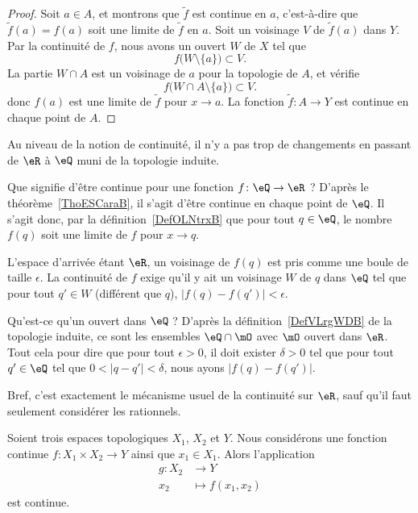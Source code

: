 \begin{proof}
    Soit \( a\in A\), et montrons que \( \tilde f\) est continue en \( a\), c'est-à-dire que \( \tilde f(a)=f(a)\) soit une limite de \( \tilde f\) en \( a\). Soit un voisinage \( V\) de \( \tilde f(a)\) dans \( Y\). Par la continuité de \( f\), nous avons un ouvert \( W\) de \( X\) tel que 
    \begin{equation}
        f\big( W\setminus\{ a \} \big)\subset V.
    \end{equation}
    La partie \( W\cap A\) est un voisinage de \( a\) pour la topologie de \( A\), et vérifie
    \begin{equation}
        f\big( W\cap A\setminus\{ a \} \big)\subset V.
    \end{equation}
    donc \( f(a)\) est une limite de \( \tilde f\) pour \( x\to a\). La fonction \( \tilde f\colon A\to Y\) est continue en chaque point de \( A\).
\end{proof}

Au niveau de la notion de continuité, il n'y a pas trop de changements en passant de \( \eR\) à \( \eQ\) muni de la topologie induite.

\begin{example}     \label{EXooHWIIooYYbfGE}
    Que signifie d'être continue pour une fonction \( f\colon \eQ\to \eR\) ? D'après le théorème~\ref{ThoESCaraB}, il s'agit d'être continue en chaque point de \( \eQ\). Il s'agit donc, par la définition~\ref{DefOLNtrxB} que pour tout \( q\in \eQ\), le nombre \( f(q)\) soit une limite de \( f\) pour \( x\to q\).

    L'espace d'arrivée étant \( \eR\), un voisinage de \( f(q)\) est pris comme une boule de taille \( \epsilon\). La continuité de \( f\) exige qu'il y ait un voisinage \( W\) de \( q\) dans \( \eQ\) tel que pour tout \( q'\in W\) (différent que \( q\)), \( | f(q)-f(q') |<\epsilon\).

    Qu'est-ce qu'un ouvert dans \( \eQ\) ? D'après la définition~\ref{DefVLrgWDB} de la topologie induite, ce sont les ensembles \( \eQ\cap\mO\) avec \( \mO\) ouvert dans \( \eR\). Tout cela pour dire que pour tout \( \epsilon>0\), il doit exister \( \delta>0\) tel que pour tout \( q'\in \eQ\) tel que \( 0<| q-q' |<\delta\), nous ayons \( | f(q)-f(q') |\).

    Bref, c'est exactement le mécanisme usuel de la continuité sur \( \eR\), sauf qu'il faut seulement considérer les rationnels.
\end{example}

\begin{lemma}       \label{LEMooHAODooYSPmvH}
    Soient trois espaces topologiques \( X_1\), \( X_2\) et \( Y\). Nous considérons une fonction continue \( f\colon X_1\times X_2\to Y\) ainsi que \( x_1\in X_1\). Alors l'application
    \begin{equation}
        \begin{aligned}
            g\colon X_2&\to Y \\
            x_2&\mapsto f(x_1,x_2)
        \end{aligned}
    \end{equation}
    est continue.
\end{lemma}

